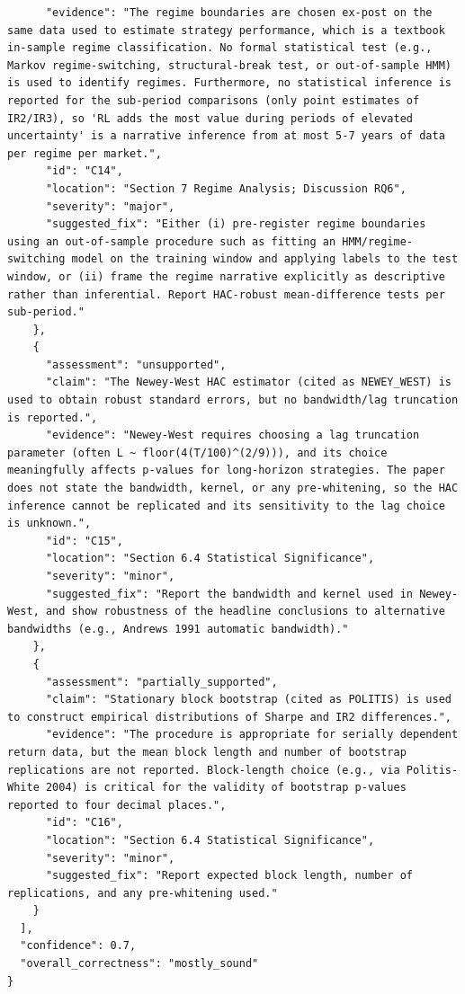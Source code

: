 \documentclass[11pt]{article}
\begin{document}
\begin{verbatim}
      "evidence": "The regime boundaries are chosen ex-post on the same data used to estimate strategy performance, which is a textbook in-sample regime classification. No formal statistical test (e.g., Markov regime-switching, structural-break test, or out-of-sample HMM) is used to identify regimes. Furthermore, no statistical inference is reported for the sub-period comparisons (only point estimates of IR2/IR3), so 'RL adds the most value during periods of elevated uncertainty' is a narrative inference from at most 5-7 years of data per regime per market.",
      "id": "C14",
      "location": "Section 7 Regime Analysis; Discussion RQ6",
      "severity": "major",
      "suggested_fix": "Either (i) pre-register regime boundaries using an out-of-sample procedure such as fitting an HMM/regime-switching model on the training window and applying labels to the test window, or (ii) frame the regime narrative explicitly as descriptive rather than inferential. Report HAC-robust mean-difference tests per sub-period."
    },
    {
      "assessment": "unsupported",
      "claim": "The Newey-West HAC estimator (cited as NEWEY_WEST) is used to obtain robust standard errors, but no bandwidth/lag truncation is reported.",
      "evidence": "Newey-West requires choosing a lag truncation parameter (often L ~ floor(4(T/100)^(2/9))), and its choice meaningfully affects p-values for long-horizon strategies. The paper does not state the bandwidth, kernel, or any pre-whitening, so the HAC inference cannot be replicated and its sensitivity to the lag choice is unknown.",
      "id": "C15",
      "location": "Section 6.4 Statistical Significance",
      "severity": "minor",
      "suggested_fix": "Report the bandwidth and kernel used in Newey-West, and show robustness of the headline conclusions to alternative bandwidths (e.g., Andrews 1991 automatic bandwidth)."
    },
    {
      "assessment": "partially_supported",
      "claim": "Stationary block bootstrap (cited as POLITIS) is used to construct empirical distributions of Sharpe and IR2 differences.",
      "evidence": "The procedure is appropriate for serially dependent return data, but the mean block length and number of bootstrap replications are not reported. Block-length choice (e.g., via Politis-White 2004) is critical for the validity of bootstrap p-values reported to four decimal places.",
      "id": "C16",
      "location": "Section 6.4 Statistical Significance",
      "severity": "minor",
      "suggested_fix": "Report expected block length, number of replications, and any pre-whitening used."
    }
  ],
  "confidence": 0.7,
  "overall_correctness": "mostly_sound"
}
\end{verbatim}
\end{document}
